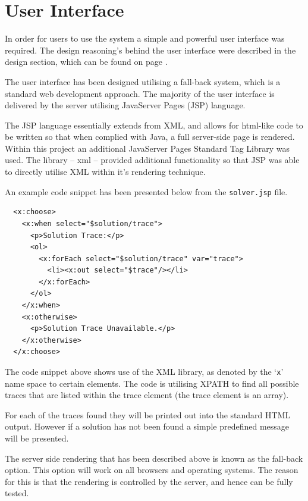 \section{User Interface}
\label{sec:imp_user_interface}

In order for users to use the system a simple and powerful user interface was 
required. The design reasoning's behind the user interface were described in 
the  design section, which can be found on 
page \pageref{sec:design_user_interface}.

The user interface has been designed utilising a fall-back system, which is a 
standard web development approach. The majority of the user interface is 
delivered by the server utilising JavaServer Pages (JSP) language.

The JSP language essentially extends from XML, and allows for html-like code to 
be written so that when complied with Java, a full server-side page is rendered.
Within this project an additional JavaServer Pages Standard Tag Library was 
used. The library -- xml -- provided additional functionality so that JSP was 
able to directly utilise XML within it's rendering technique.

An example code snippet has been presented below from the \texttt{solver.jsp} 
file.

\begin{verbatim}
  <x:choose>
    <x:when select="$solution/trace">
      <p>Solution Trace:</p>
      <ol>
        <x:forEach select="$solution/trace" var="trace">
          <li><x:out select="$trace"/></li>
        </x:forEach>
      </ol>
    </x:when>
    <x:otherwise>
      <p>Solution Trace Unavailable.</p>
    </x:otherwise>
  </x:choose>
\end{verbatim}

The code snippet above shows use of the XML library, as denoted by the 
`\texttt{x}' name space to certain elements. The code is utilising XPATH to find
all possible traces that are listed within the trace element (the trace element 
is an array).

For each of the traces found they will be printed out into the standard HTML 
output. However if a solution has not been found a simple predefined message 
will be presented.

The server side rendering that has been described above is known as the 
fall-back option. This option will work on all browsers and operating systems. 
The reason for this is that the rendering is controlled by the server, and hence
can be fully tested.

